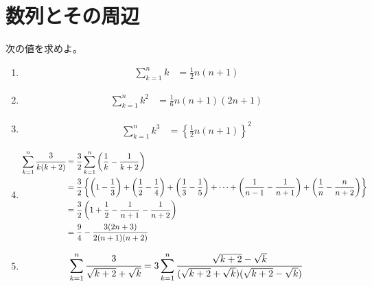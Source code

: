 \documentclass[autodetect-engine,ja=standard, 10.5pt, a4paper, titlepage]{bxjsarticle}
\begin{document}
\section*{数列とその周辺}
\noindent 次の値を求めよ。
\begin{enumerate}[1.]
  \item
    \begin{fleqn}[20pt]
      \begin{align*}
        \sum_{k=1}^{n}k
        &= \frac{1}{2}n(n+1)
      \end{align*}
    \end{fleqn}

  \item
    \begin{fleqn}[20pt]
      \begin{align*}
        \sum_{k=1}^{n}k^2
        &= \frac{1}{6}n (n+1)(2n+1)
      \end{align*}
    \end{fleqn}
  \item
    \begin{fleqn}[20pt]
      \begin{align*}
        \sum_{k=1}^{n}k^3
        &= \left\{ \frac{1}{2}n(n+1) \right\}^2
      \end{align*}
    \end{fleqn}
  \item
    \begin{fleqn}[20pt]
      \begin{align*}
        \sum_{k=1}^{n}\cfrac{3}{k(k+2)}
        &= \frac{3}{2}\sum_{k=1}^{n}\left( \frac{1}{k} - \frac{1}{k+2} \right) \\
        &= \frac{3}{2} \left\{
          \left(1-\frac{1}{3}\right) + \left(\frac{1}{2}-\frac{1}{4}\right)
          + \left(\frac{1}{3}-\frac{1}{5}\right)
          + \cdots + \left(\frac{1}{n-1}-\frac{1}{n+1}\right)
          + \left(\frac{1}{n}-\frac{n}{n+2}\right)
          \right\} \\
        &= \frac{3}{2}\left(1+\frac{1}{2}-\frac{1}{n+1}-\frac{1}{n+2}\right) \\
        &= \frac{9}{4} - \frac{3(2n+3)}{2(n+1)(n+2)}
      \end{align*}
    \end{fleqn}
  \item
    \begin{fleqn}[20pt]
      \begin{align*}
        \sum_{k=1}^{n}\cfrac{3}{\sqrt{k+2} + \sqrt{k}}
        &= 3 \sum_{k=1}^{n}\frac{\sqrt{k+2}-\sqrt{k}}{(\sqrt{k+2}+\sqrt{k})(\sqrt{k+2}-\sqrt{k})} \\

\end{align*}
\end{fleqn}
\end{enumerate}
\end{document}
